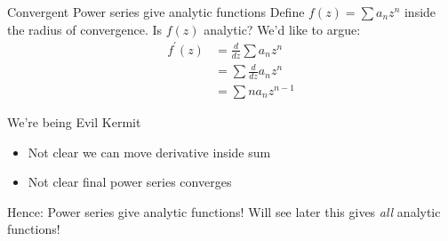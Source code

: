 \documentclass{beamer}
\begin{document}
\begin{frame}{Convergent Power series give analytic functions}
Define $f(z)=\sum a_nz^n$ inside the radius of convergence.  Is $f(z)$ analytic?  We'd like to argue:
\begin{align*}f^\prime(z)&=\frac{d}{dz}\sum a_nz^n \\
&=\sum \frac{d}{dz} a_nz^n \\
&=\sum na_nz^{n-1}
\end{align*}
\begin{block}{We're being Evil Kermit}
\begin{itemize}
    \item Not clear we can move derivative inside sum
    \item Not clear final power series converges
\end{itemize}
\end{block}
\begin{block}{Hence: Power series give analytic functions!}
Will see later this gives \emph{all} analytic functions!
\end{block}
\end{frame}
\end{document}
